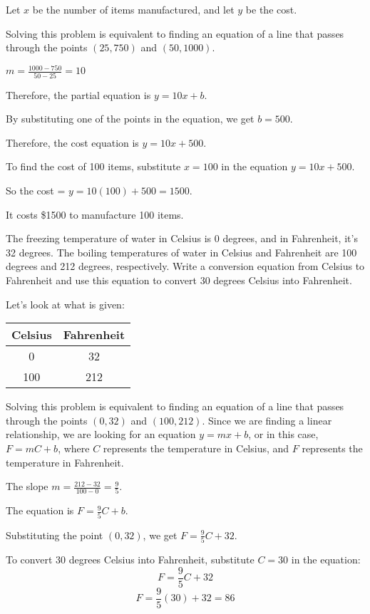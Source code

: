 \begin{solution}
    Let $x$ be the number of items manufactured, and let $y$ be the cost.

    Solving this problem is equivalent to finding an equation of a line that passes through the points $(25, 750)$ and $(50, 1000)$.

    $m = \frac{1000 - 750}{50 - 25} = 10$

    Therefore, the partial equation is $y = 10x + b$.

    By substituting one of the points in the equation, we get $b = 500$.

    Therefore, the cost equation is $y = 10x + 500$.

    To find the cost of 100 items, substitute $x = 100$ in the equation $y = 10x + 500$.

    So the cost = $y = 10(100) + 500 = 1500$.

    It costs \$1500 to manufacture 100 items.
\end{solution}

\begin{example}
    The freezing temperature of water in Celsius is 0 degrees, and in Fahrenheit, it's 32 degrees. The boiling temperatures of water in Celsius and Fahrenheit are 100 degrees and 212 degrees, respectively. Write a conversion equation from Celsius to Fahrenheit and use this equation to convert 30 degrees Celsius into Fahrenheit.
\end{example}

\begin{solution}
    Let's look at what is given:

    \begin{center}
        \begin{tabular}{|c|c|}
            \hline
            Celsius & Fahrenheit \\
            \hline
            0       & 32         \\
            100     & 212        \\
            \hline
        \end{tabular}
    \end{center}

    Solving this problem is equivalent to finding an equation of a line that passes through the points $(0, 32)$ and $(100, 212)$. Since we are finding a linear relationship, we are looking for an equation $y = mx + b$, or in this case, $F = mC + b$, where $C$ represents the temperature in Celsius, and $F$ represents the temperature in Fahrenheit.

    The slope $m = \frac{212 - 32}{100 - 0} = \frac{9}{5}$.

    The equation is $F = \frac{9}{5}C + b$.

    Substituting the point $(0, 32)$, we get $F = \frac{9}{5}C + 32$.

    To convert 30 degrees Celsius into Fahrenheit, substitute $C = 30$ in the equation:
    \[F = \frac{9}{5}C + 32\]
    \[F = \frac{9}{5}(30) + 32 = 86\]
\end{solution}

